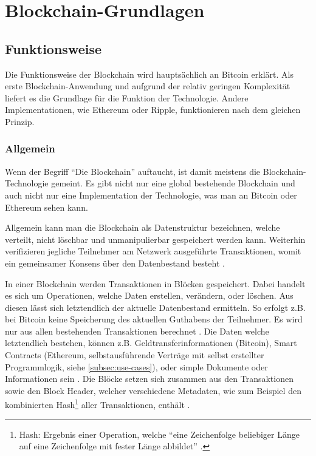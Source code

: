 \chapter{Blockchain-Grundlagen}
\label{cha:grundlagen}

\section{Funktionsweise}
Die Funktionsweise der Blockchain wird hauptsächlich an Bitcoin erklärt. Als erste Blockchain-Anwendung \cite{ZhengBlockchainChallengesOpportunities2017} und aufgrund der relativ geringen Komplexität liefert es die Grundlage für die Funktion der Technologie. Andere Implementationen, wie Ethereum oder Ripple, funktionieren nach dem gleichen Prinzip.


\subsection{Allgemein}
Wenn der Begriff ``Die Blockchain'' auftaucht, ist damit meistens die Blockchain-Technologie gemeint. Es gibt nicht nur eine global bestehende Blockchain und auch nicht nur eine Implementation der Technologie, was man an Bitcoin oder Ethereum sehen kann.

Allgemein kann man die Blockchain als Datenstruktur bezeichnen, welche verteilt, nicht löschbar und unmanipulierbar gespeichert werden kann. Weiterhin verifizieren jegliche Teilnehmer am Netzwerk ausgeführte Transaktionen, womit ein gemeinsamer Konsens über den Datenbestand besteht \cite{CrosbyBlockChainTechnologyBitcoin2016}.

In einer Blockchain werden Transaktionen in Blöcken gespeichert. Dabei handelt es sich um Operationen, welche Daten erstellen, verändern, oder löschen. Aus diesen lässt sich letztendlich der aktuelle Datenbestand ermitteln. So erfolgt z.B. bei Bitcoin keine Speicherung des aktuellen Guthabens der Teilnehmer. Es wird nur aus allen bestehenden Transaktionen berechnet \cite{AntonopoulosMasteringbitcoin2015}. Die Daten welche letztendlich bestehen, können z.B. Geldtransferinformationen (Bitcoin), Smart Contracts (Ethereum, selbstausführende Verträge mit selbst erstellter Programmlogik, siehe \ref{subsec:use-cases}), oder simple Dokumente oder Informationen sein \cite{EthereumTeamEthereumWhitePaper2017}\cite{NakamotoBitcoinPeertoPeerElectronic2008}\cite{HyperledgerFabricTeamHyperledgerWhitepaper2016}. Die Blöcke setzen sich zusammen aus den Transaktionen sowie den Block Header, welcher verschiedene Metadaten, wie zum Beispiel den kombinierten Hash\footnote{Hash: Ergebnis einer Operation, welche ``eine Zeichenfolge beliebiger Länge auf eine Zeichenfolge mit fester Länge abbildet'' \cite{WikipediaKryptologischeHashfunktion2017}.} aller Transaktionen, enthält \cite{AntonopoulosMasteringbitcoin2015}.

